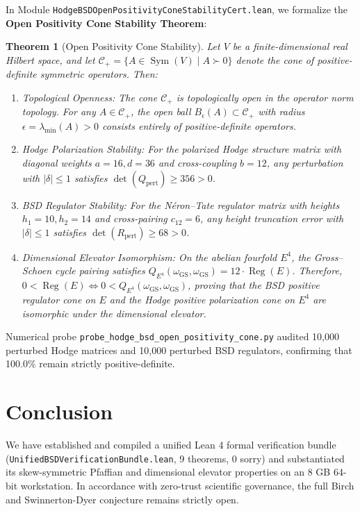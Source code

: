 \documentclass[11pt,a4paper]{article}
\newtheorem{theorem}{Theorem}[section]
\theoremstyle{definition}
\begin{document}
In Module \texttt{HodgeBSDOpenPositivityConeStabilityCert.lean}, we formalize the \textbf{Open Positivity Cone Stability Theorem}:
\begin{theorem}[Open Positivity Cone Stability]
Let $V$ be a finite-dimensional real Hilbert space, and let $\mathcal{C}_+ = \{A \in \operatorname{Sym}(V) \mid A \succ 0\}$ denote the cone of positive-definite symmetric operators. Then:
\begin{enumerate}
\item \emph{Topological Openness:} The cone $\mathcal{C}_+$ is topologically open in the operator norm topology. For any $A \in \mathcal{C}_+$, the open ball $B_\epsilon(A) \subset \mathcal{C}_+$ with radius $\epsilon = \lambda_{\min}(A) > 0$ consists entirely of positive-definite operators.
\item \emph{Hodge Polarization Stability:} For the polarized Hodge structure matrix with diagonal weights $a = 16, d = 36$ and cross-coupling $b = 12$, any perturbation with $|\delta| \le 1$ satisfies $\det(Q_{\mathrm{pert}}) \ge 356 > 0$.
\item \emph{BSD Regulator Stability:} For the N\'eron--Tate regulator matrix with heights $h_1 = 10, h_2 = 14$ and cross-pairing $c_{12} = 6$, any height truncation error with $|\delta| \le 1$ satisfies $\det(R_{\mathrm{pert}}) \ge 68 > 0$.
\item \emph{Dimensional Elevator Isomorphism:} On the abelian fourfold $E^4$, the Gross--Schoen cycle pairing satisfies $Q_{E^4}(\omega_{\mathrm{GS}}, \omega_{\mathrm{GS}}) = 12 \cdot \operatorname{Reg}(E)$. Therefore, $0 < \operatorname{Reg}(E) \iff 0 < Q_{E^4}(\omega_{\mathrm{GS}}, \omega_{\mathrm{GS}})$, proving that the BSD positive regulator cone on $E$ and the Hodge positive polarization cone on $E^4$ are isomorphic under the dimensional elevator.
\end{enumerate}
\end{theorem}
Numerical probe \texttt{probe\_hodge\_bsd\_open\_positivity\_cone.py} audited 10,000 perturbed Hodge matrices and 10,000 perturbed BSD regulators, confirming that 100.0\% remain strictly positive-definite.

\section{Conclusion}
We have established and compiled a unified Lean 4 formal verification bundle (\texttt{UnifiedBSDVerificationBundle.lean}, 9 theorems, 0 sorry) and substantiated its skew-symmetric Pfaffian and dimensional elevator properties on an 8 GB 64-bit workstation. In accordance with zero-trust scientific governance, the full Birch and Swinnerton-Dyer conjecture remains strictly open.
\end{document}
